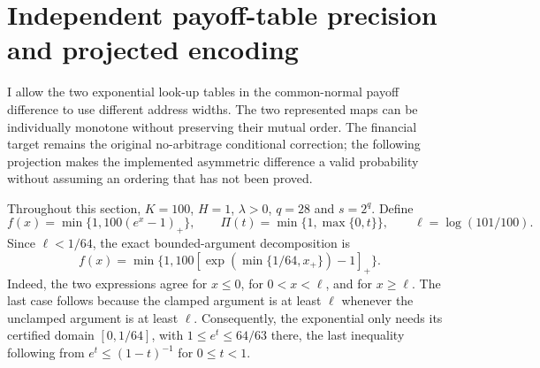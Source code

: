 \section{Independent payoff-table precision and projected encoding}
\label{sec:raw-asymmetric-projection}

I allow the two exponential look-up tables in the common-normal payoff
difference to use different address widths. The two represented maps can
be individually monotone without preserving their mutual order. The
financial target remains the original no-arbitrage conditional correction;
the following projection makes the implemented asymmetric difference a
valid probability without assuming an ordering that has not been proved.

Throughout this section, $K=100$, $H=1$, $\lambda>0$, $q=28$ and
$s=2^q$. Define
\begin{equation}
 f(x)=\min\{1,100(e^x-1)_+\},\qquad
 \Pi(t)=\min\{1,\max\{0,t\}\},\qquad
 \ell=\log(101/100).
\end{equation}
Since $\ell<1/64$, the exact bounded-argument decomposition is
\begin{equation}
 f(x)=\min\{1,100[\exp(\min\{1/64,x_+\})-1]_+\}.
\end{equation}
Indeed, the two expressions agree for $x\leq0$, for
$0<x<\ell$, and for $x\geq\ell$. The last case follows because
the clamped argument is at least $\ell$ whenever the unclamped
argument is at least $\ell$. Consequently, the exponential only needs
its certified domain $[0,1/64]$, with
$1\leq e^t\leq64/63$ there, the last inequality following from
$e^t\leq(1-t)^{-1}$ for $0\leq t<1$.

